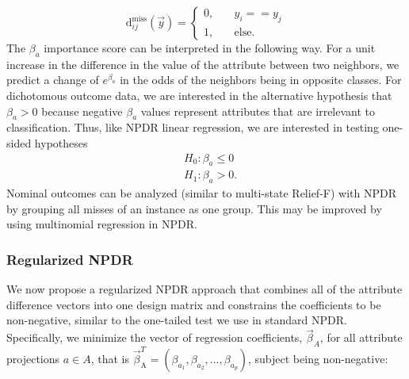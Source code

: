 \documentclass[10pt]{article}
\begin{document}
\begin{equation}\label{eq:hitdiff}
\text{d}^{\text{miss}}_{ij}(\vec{y}) = \left\{
    \begin{array}{ll}
        0, & \quad  y_{i} == y_{j} \\
        1, & \quad \text{else}.
    \end{array}
\right.
\end{equation}
The $\beta_a$ importance score can be interpreted in the following way. For a unit increase in the difference in the value of the attribute between two neighbors, we predict a change of $e^{\beta_a}$ in the odds of the neighbors being in opposite classes. For dichotomous outcome data, we are interested in the alternative hypothesis that $\beta_a>0$ because negative $\beta_a$ values represent attributes that are irrelevant to classification. Thus, like NPDR linear regression, we are interested in testing one-sided hypotheses
\begin{equation}
\begin{aligned}
    & H_0: \beta_a \le 0 \\
    & H_1: \beta_a > 0.
\end{aligned}
\end{equation}
Nominal outcomes can be analyzed (similar to multi-state Relief-F) with NPDR by grouping all misses of an instance as one group. This may be improved by using multinomial regression in NPDR. 

\subsubsection{Regularized NPDR}

We now propose a regularized NPDR approach that combines all of the attribute difference vectors into one design matrix and constrains the coefficients to be non-negative, similar to the one-tailed test we use in standard NPDR.
Specifically, we minimize the vector of regression coefficients, $\vec{\beta}_A$, for all attribute projections $a \in A$, that is $\vec{\beta}^{T}_{\text{A}} = (\beta_{a_1}, \beta_{a_2}, \ldots, \beta_{a_p})$, subject being non-negative: 
\end{document}
